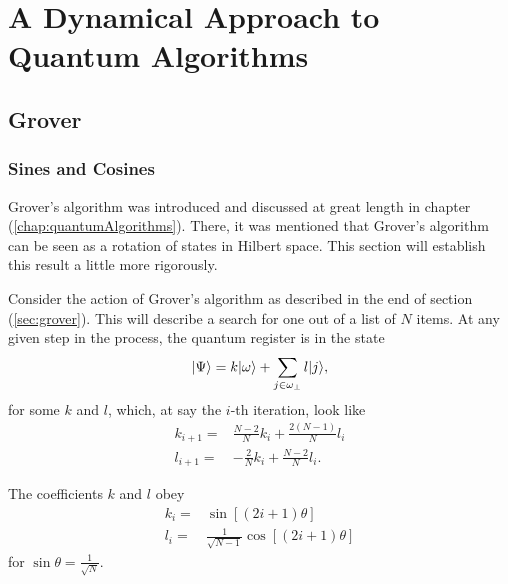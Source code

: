 
\chapter{A Dynamical Approach to Quantum Algorithms}
\label{chap:dynamics}
%

\section{Grover}

\subsection{Sines and Cosines}

Grover's algorithm was introduced and discussed at great length in
chapter (\ref{chap:quantumAlgorithms}).  There, it was mentioned that
Grover's algorithm can be seen as a rotation of states in Hilbert
space.  This section will establish this result a little more rigorously.

Consider the action of Grover's algorithm as described in the end of
section (\ref{sec:grover}).  This will describe a search for one 
out of a list of $N$ items.  At any given step in the process, the
quantum register is in the state
\begin{equation}
{|{\Psi}\rangle} = k{|{\omega}\rangle} + \sum_{j\in\omega_\perp}l{|{j}\rangle},
\end{equation}
for some $k$ and $l$, which, at say the $i$-th iteration, 
look like
\begin{equation}
\begin{split}
k_{i+1} =& \frac{N-2}{N}k_i + \frac{2(N-1)}{N}l_i\\
l_{i+1} =& -\frac{2}{N}k_i + \frac{N-2}{N}l_i.
\end{split}
\label{e:discsincos}
\end{equation}

\begin{prop}
The coefficients $k$ and $l$ obey
\begin{equation}
\begin{split}
k_i =& \sin\left[\left(2i+1\right)\theta\right]\\
l_i =& \frac{1}{\sqrt{N-1}}\cos\left[\left(2i+1\right)\theta\right]
\end{split}
\label{e:sincos}
\end{equation}
for $\sin\theta = \frac{1}{\sqrt{N}}$.
\end{prop}

